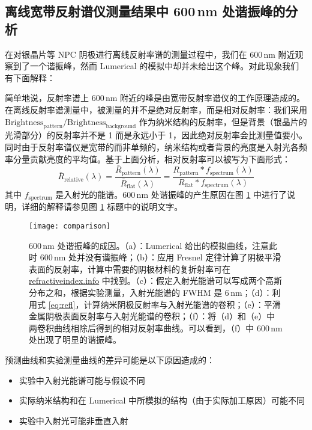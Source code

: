 \subsection{离线宽带反射谱仪测量结果中 600\,nm 处谐振峰的分析}
在对银晶片等 NPC 阴极进行离线反射率谱的测量过程中，我们在 600\,nm 附近观察到了一个谐振峰，然而 Lumerical 的模拟中却并未给出这个峰。对此现象我们有下面解释：

简单地说，反射率谱上 600\,nm 附近的峰是由宽带反射率谱仪的工作原理造成的。在离线反射率谱测量中，被测量的并不是绝对反射率，而是相对反射率：我们采用 $\text{Brightness}_{\text{pattern}}/\text{Brightness}_{\text{background}}$ 作为纳米结构的反射率，但是背景（银晶片的光滑部分）的反射率并不是 1 而是永远小于 1，因此绝对反射率会比测量值要小。同时由于反射率谱仪是宽带的而非单频的，纳米结构或者背景的亮度是入射光各频率分量贡献亮度的平均值。基于上面分析，相对反射率可以被写为下面形式：
\begin{equation}
\label{eq:refl}
\bar{R}_{\text{relative}}(\lambda) = \dfrac{\bar{R}_{\text{pattern}}(\lambda)}{\bar{R}_{\text{flat}}(\lambda)} = \dfrac{R_{\text{pattern}}\ast f_{\text{spectrum}}(\lambda)}{R_{\text{flat}}\ast f_{\text{spectrum}}(\lambda)}
\end{equation}
其中 $f_{\text{spectrum}}$ 是入射光的能谱。600\,nm 处谐振峰的产生原因在图 \ref{fig:reason} 中进行了说明，详细的解释请参见图 \ref{fig:reason} 标题中的说明文字。
\begin{figure}[htbp]
\begin{center}
\texttt{[image: comparison]}
\caption{\label{fig:reason} 600\,nm 处谐振峰的成因。（a）：Lumerical 给出的模拟曲线，注意此时 600\,nm 处并没有谐振峰；（b）：应用 Fresnel 定律计算了阴极平滑表面的反射率，计算中需要的阴极材料的复折射率可在 \href{http://refractiveindex.info}{refractiveindex.info} 中找到。（c）：假定入射光能谱可以写成两个高斯分布之和，根据实验测量，入射光能谱的 FWHM 是 6\,nm；（d）：利用式 \ref{eq:refl}，计算纳米阴极反射率与入射光能谱的卷积；（e）：平滑金属阴极表面反射率与入射光能谱的卷积；（f）：将（d）和（e）中两卷积曲线相除后得到的相对反射率曲线。可以看到，（f）中 600\,nm 处出现了明显的谐振峰。}
\end{center}
\end{figure}
预测曲线和实验测量曲线的差异可能是以下原因造成的：
\begin{itemize}
\item 实验中入射光能谱可能与假设不同
\item 实际纳米结构和在 Lumerical 中所模拟的结构（由于实际加工原因）可能不同
\item 实验中入射光可能非垂直入射
\end{itemize}

